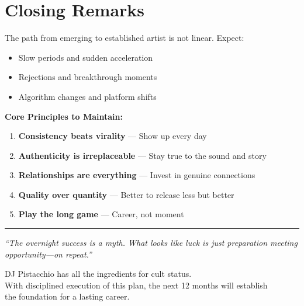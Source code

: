 \documentclass[11pt,a4paper]{article}
\begin{document}
\section{Closing Remarks}

The path from emerging to established artist is not linear. Expect:
\begin{itemize}[leftmargin=*]
    \item Slow periods and sudden acceleration
    \item Rejections and breakthrough moments
    \item Algorithm changes and platform shifts
\end{itemize}

\vspace{1em}

\noindent\textbf{Core Principles to Maintain:}
\begin{enumerate}[leftmargin=*]
    \item \textbf{Consistency beats virality} --- Show up every day
    \item \textbf{Authenticity is irreplaceable} --- Stay true to the sound and story
    \item \textbf{Relationships are everything} --- Invest in genuine connections
    \item \textbf{Quality over quantity} --- Better to release less but better
    \item \textbf{Play the long game} --- Career, not moment
\end{enumerate}

\vspace{2em}

\begin{center}
\rule{0.6\textwidth}{0.5pt}
\end{center}

\vspace{1em}

\begin{quotebox}
\centering
\large\textit{``The overnight success is a myth. What looks like luck is just preparation meeting opportunity---on repeat.''}
\end{quotebox}

\vspace{2em}

\begin{center}
DJ Pistacchio has all the ingredients for cult status.\\
With disciplined execution of this plan, the next 12 months will establish\\
the foundation for a lasting career.
\end{center}
\end{document}
